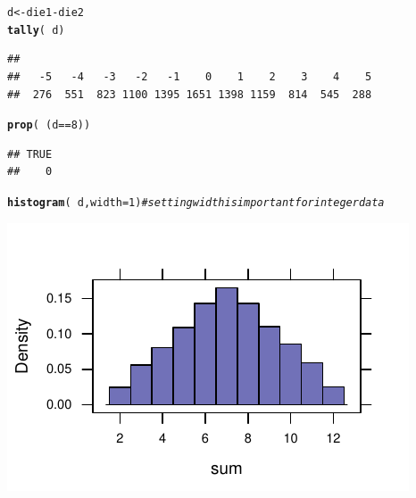 \documentclass[twoside]{book}\usepackage[]{graphicx}\usepackage[]{xcolor}
\makeatletter
\def\maxwidth{ %
  \ifdim\Gin@nat@width>\linewidth
    \linewidth
  \else
    \Gin@nat@width
  \fi
}
\newcommand{\hlnum}[1]{\textcolor[rgb]{0.686,0.059,0.569}{#1}}%
\newcommand{\hlcom}[1]{\textcolor[rgb]{0.678,0.584,0.686}{\textit{#1}}}%
\newcommand{\hlopt}[1]{\textcolor[rgb]{0,0,0}{#1}}%
\newcommand{\hlstd}[1]{\textcolor[rgb]{0.345,0.345,0.345}{#1}}%
\newcommand{\hlkwb}[1]{\textcolor[rgb]{0.69,0.353,0.396}{#1}}%
\newcommand{\hlkwc}[1]{\textcolor[rgb]{0.333,0.667,0.333}{#1}}%
\newcommand{\hlkwd}[1]{\textcolor[rgb]{0.737,0.353,0.396}{\textbf{#1}}}%
\newenvironment{kframe}{%
 \def\at@end@of@kframe{}%
 \ifinner\ifhmode%
  \def\at@end@of@kframe{\end{minipage}}%
  \begin{minipage}{\columnwidth}%
 \fi\fi%
 \def\FrameCommand##1{\hskip\@totalleftmargin \hskip-\fboxsep
 \colorbox{shadecolor}{##1}\hskip-\fboxsep
     \hskip-\linewidth \hskip-\@totalleftmargin \hskip\columnwidth}%
 \MakeFramed {\advance\hsize-\width
   \@totalleftmargin\z@ \linewidth\hsize
   \@setminipage}}%
 {\par\unskip\endMakeFramed%
 \at@end@of@kframe}
\newenvironment{knitrout}{}{} %
\makeatother
\begin{document}
\begin{solution}
\begin{knitrout}
\color{fgcolor}\begin{kframe}
\begin{alltt}
\hlstd{d} \hlkwb{<-} \hlstd{die1} \hlopt{-} \hlstd{die2}
\hlkwd{tally}\hlstd{(}\hlopt{~}\hlstd{d)}
\end{alltt}
\begin{verbatim}
## 
##   -5   -4   -3   -2   -1    0    1    2    3    4    5 
##  276  551  823 1100 1395 1651 1398 1159  814  545  288
\end{verbatim}
\begin{alltt}
\hlkwd{prop}\hlstd{(}\hlopt{~}\hlstd{(d} \hlopt{==} \hlnum{8}\hlstd{))}
\end{alltt}


{\ttfamily\noindent\itshape\color{messagecolor}{\#\#\ \ \ \  target level: TRUE;\ \ other levels: FALSE}}\begin{verbatim}
## TRUE 
##    0
\end{verbatim}
\begin{alltt}
\hlkwd{histogram}\hlstd{(}\hlopt{~}\hlstd{d,} \hlkwc{width} \hlstd{=} \hlnum{1}\hlstd{)}  \hlcom{# setting width is important for integer data}
\end{alltt}
\end{kframe}

{\centering \includegraphics[width=\maxwidth]{figures/fig-unnamed-chunk-51-1} 

}



\end{knitrout}
\end{solution}
\end{document}
